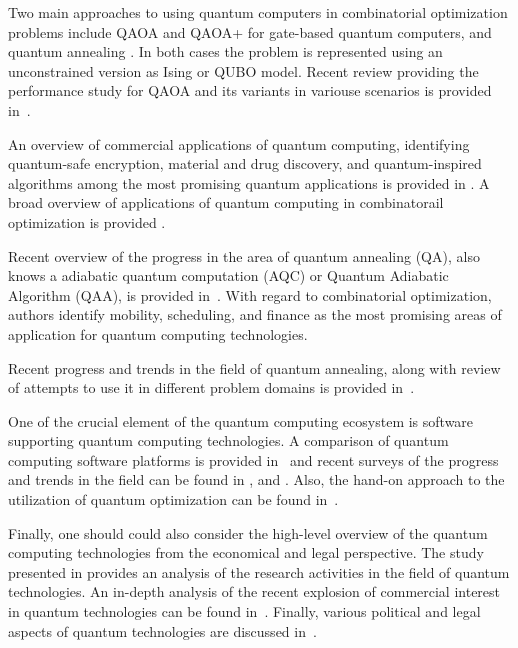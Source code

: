 \documentclass[a4paper,11pt]{article}
\begin{document}
Two main approaches to using quantum computers in combinatorial optimization problems include QAOA \cite{farhi2014quantum} and QAOA+ \cite{hadfield2019quantum} for gate-based quantum computers, and quantum annealing \cite{canivell2021startup}. In both cases the problem is represented using an unconstrained version as Ising  \cite{lucas2014ising} or QUBO \cite{glover2018tutorial} model. Recent review providing the performance study for QAOA and its variants in variouse scenarios is provided in~\cite{blekos2023review}.

An overview of commercial applications of quantum computing, identifying  quantum-safe encryption, material and drug discovery, and quantum-inspired algorithms among the most promising quantum applications is provided in \cite{bova2021commercial}. A broad overview of applications of quantum computing in combinatorail optimization is provided \cite{gemeinhardt2023quantum}.

Recent overview of the progress in the area of quantum annealing (QA), also knows a adiabatic quantum computation (AQC) or Quantum Adiabatic Algorithm (QAA), is provided in~\cite{yarkoni2022quantum}. With regard to combinatorial optimization, authors identify mobility, scheduling, and finance as the most promising areas of application for quantum computing technologies.

Recent progress and trends in the field of quantum annealing, along with review of attempts to use it in different problem domains is provided in~\cite{yulianti2022implementation}.

One of the crucial element of the quantum computing ecosystem is software supporting quantum computing technologies. A comparison of quantum computing software platforms is provided in~\cite{larose2019overview} and recent surveys of the progress and trends in the field can be found in \cite{zhao2020quantum}, \cite{gill2021quantum} and \cite{miszczak2023symbolic}. Also, the hand-on approach to the utilization of quantum optimization can be found in~\cite{combarro2023practical}.

Finally, one should could also consider the high-level overview of the quantum computing technologies from the economical and legal perspective.
The study presented in \cite{seskir2021landscape} provides an analysis of the research activities in the field of quantum technologies. An in-depth analysis of the recent explosion of commercial interest in quantum technologies can be found in~\cite{seskir2022landscape}. Finally, various political and legal aspects of quantum technologies are discussed in~\cite{hoofnagle2021law}. 
\end{document}
